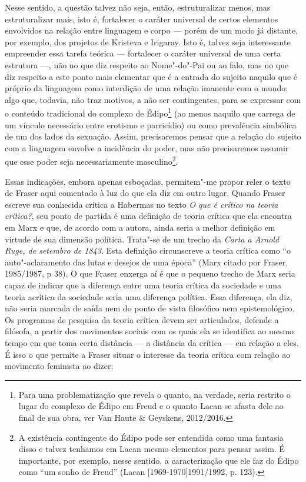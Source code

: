 Nesse sentido, a questão talvez não seja, então, estruturalizar menos,
mas estruturalizar mais, isto é, fortalecer o caráter universal de
certos elementos envolvidos na relação entre linguagem e corpo --- porém
de um modo já distante, por exemplo, dos projetos de Kristeva e
Irigaray. Isto é, talvez seja interessante empreender essa tarefa
teórica --- fortalecer o caráter universal de uma certa estrutura ---, não
no que diz respeito ao Nome"-do"-Pai ou ao falo, mas no que diz respeito a
este ponto mais elementar que é a entrada do sujeito naquilo que é
próprio da linguagem como interdição de uma relação imanente com o
mundo; algo que, todavia, não traz motivos, a não ser contingentes, para
se expressar com o conteúdo tradicional do complexo de Édipo\footnote{Para
  uma problematização que revela o quanto, na verdade, seria restrito o
  lugar do complexo de Édipo em Freud e o quanto Lacan se afasta dele ao
  final de sua obra, ver Van Haute \& Geyskens, 2012/2016.} (ao menos
naquilo que carrega de um vínculo necessário entre erotismo e
parricídio) ou como prevalência simbólica de um dos lados da sexuação.
Assim, precisaremos pensar que a relação do sujeito com a linguagem
envolve a incidência do poder, mas não precisaremos assumir que esse
poder seja necessariamente masculino\footnote{A existência contingente
  do Édipo pode ser entendida como uma fantasia disso e talvez tenhamos
  em Lacan mesmo elementos para pensar assim. É importante, por exemplo,
  nesse sentido, a caracterização que ele faz do Édipo como ``um sonho
  de Freud'' (Lacan {[}1969-1970{]}1991/1992, p. 123).}.

Essas indicações, embora apenas esboçadas, permitem"-me propor reler o
texto de Fraser aqui comentado à luz do que ela diz em outro lugar.
Quando Fraser escreve sua conhecida crítica a Habermas no texto \emph{O
que é crítico na teoria crítica?}, seu ponto de partida é uma definição
de teoria crítica que ela encontra em Marx e que, de acordo com a
autora, ainda seria a melhor definição em virtude de sua dimensão
política. Trata"-se de um trecho da \emph{Carta a Arnold Ruge, de
setembro de 1843}. Esta definição circunscreve a teoria crítica como ``o
auto"-aclaramento das lutas e desejos de uma época'' (Marx citado por
Fraser, 1985/1987, p 38). O que Fraser enxerga aí é que o pequeno trecho
de Marx seria capaz de indicar que a diferença entre uma teoria crítica
da sociedade e uma teoria acrítica da sociedade seria uma diferença
política. Essa diferença, ela diz, não seria marcada de saída nem do
ponto de vista filosófico nem epistemológico. Os programas de pesquisa
da teoria crítica devem ser articulados, defende a filósofa, a partir
dos movimentos sociais com os quais ela se identifica ao mesmo tempo em
que toma certa distância --- a distância da crítica --- em relação a eles.
É isso o que permite a Fraser situar o interesse da teoria crítica com
relação ao movimento feminista ao dizer:

